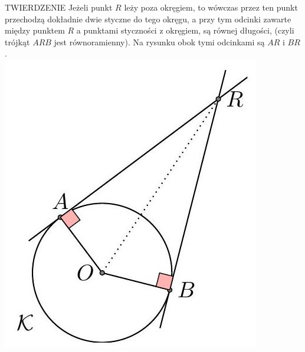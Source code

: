 \documentclass[10pt]{article}
\begin{document}
TWIERDZENIE Jeżeli punkt \(R\) leży poza okręgiem, to wówczas przez ten punkt przechodzą dokładnie dwie styczne do tego okręgu, a przy tym odcinki zawarte między punktem \(R\) a punktami styczności z okręgiem, są równej długości, (czyli trójkąt \(A R B\) jest równoramienny). Na rysunku obok tymi odcinkami są \(A R\) i \(B R\).\\
\includegraphics[max width=\textwidth, center]{2024_11_21_e9b4faa005d5be2cc318g-040}
\end{document}
